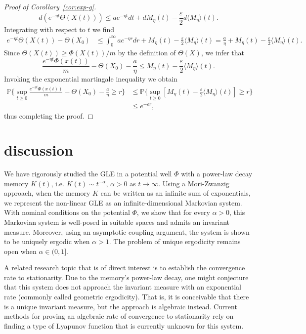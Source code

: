 \documentclass[11pt]{amsart}
\theoremstyle{definition}
\newcommand{\la}{\langle}
\newcommand{\ra}{\rangle}
\newcommand{\Pnone}{\mathbb{P}}
\theoremstyle{definition}
\theoremstyle{plain}
\numberwithin{equation}{section}
\begin{document}
\begin{proof}[Proof of Corollary~\ref{cor:exp-g}]
\begin{equation*}\label{ineq:exp-g-8}
d(e^{-\eta t}\Theta(X(t)))\leq  ae^{-\eta t}dt + d M_\eta (t)-\frac{\varepsilon}{2}d\la M_\eta\ra(t).
\end{equation*}
Integrating with respect to $t$ we find
\begin{align*}\label{ineq:exp-g-9}
e^{-\eta t}\Theta(X(t))-\Theta(X_0) &\leq  \int_0^\infty ae^{-\eta r}dr + M_\eta (t)-\frac{\varepsilon}{2}\la M_\eta\ra(t)=\frac{a}{\eta}+M_\eta (t)-\frac{\varepsilon}{2}\la M_\eta\ra(t).
\end{align*}
Since $\Theta(X(t))\geq \Phi(X(t))/m$ by the definition of $\Theta(X)$, we infer that
\begin{equation*}\label{ineq:exp-g-10}
\frac{e^{-\eta t}\Phi(x(t))}{m}-\Theta(X_0)-\frac{a}{\eta}\leq M_\eta (t)-\frac{\varepsilon}{2}\la M_\eta\ra(t).
\end{equation*}
Invoking the exponential martingale inequality we obtain 
\begin{align*}\label{ineq:exp-g-11}
\Pnone \Big\{\sup_{t\geq 0}\frac{e^{-\eta t}\Phi(x(t))}{m}-\Theta(X_0)-\frac{a}{\eta}\geq r\Big\}&\leq\Pnone \Big\{ \sup_{t\geq 0}\left[M_\eta (t)-\frac{\varepsilon}{2}\la M_\eta\ra(t)\right]\geq r\Big\}\\
&\leq e^{-\varepsilon r},
\end{align*}
thus completing the proof.  
\end{proof}

\section{discussion} \label{sec:discussion} We have rigorously studied the GLE in a potential well $\Phi$ with a power-law decay memory $K(t)$, i.e. $K(t)\sim t^{-\alpha}$, $\alpha>0$ as $t\to\infty$. Using a Mori-Zwanzig approach, when the memory $K$ can be written as an infinite sum of exponentials, we represent the non-linear GLE as an infinite-dimensional Markovian system. With nominal conditions on the potential $\Phi$, we show that for every $\alpha>0$, this Markovian system is well-posed in suitable spaces and admits an invariant measure. Moreover, using an asymptotic coupling argument, the system is shown to be uniquely ergodic when $\alpha>1$. The problem of unique ergodicity remains open when $\alpha\in(0,1]$. 

A related research topic that is of direct interest is to establish the convergence rate to stationarity. Due to the memory's power-law decay, one might conjecture that this system does not approach the invariant measure with an exponential rate (commonly called geometric ergodicity). That is, it is conceivable that there is a unique invariant measure, but the approach is algebraic instead. Current methods for proving an algebraic rate of convergence to stationarity rely on finding a type of Lyapunov function that is currently unknown for this system.
\end{document}
